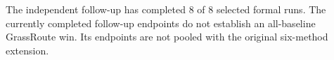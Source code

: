 The independent follow-up has completed 8 of 8 selected formal runs. The currently completed follow-up endpoints do not establish an all-baseline GrassRoute win. Its endpoints are not pooled with the original six-method extension.
